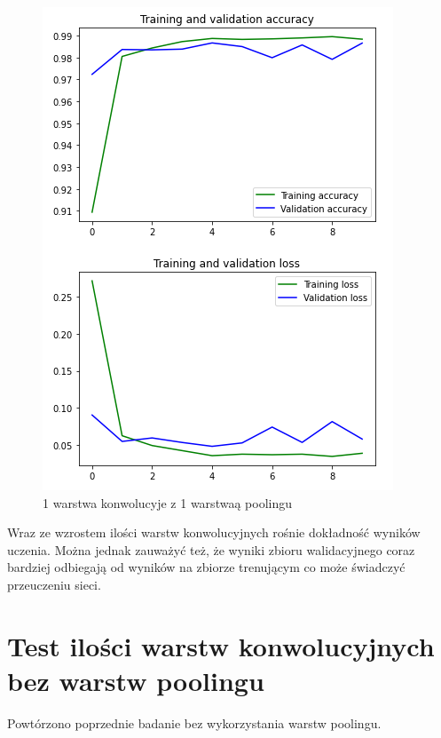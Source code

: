 \documentclass{article}
\begin{document}
\begin{figure}[h]
  \centering
  \includegraphics[width=\linewidth]{3_conv_3_max.png}
  \caption{1 warstwa konwolucyje z 1 warstwaą poolingu}
\end{figure}

Wraz ze wzrostem ilości warstw konwolucyjnych rośnie dokładność wyników uczenia. Można jednak zauważyć też,
że wyniki zbioru walidacyjnego coraz bardziej odbiegają od wyników na zbiorze trenującym co może świadczyć
przeuczeniu sieci.


\section{Test ilości warstw konwolucyjnych bez warstw poolingu}

Powtórzono poprzednie badanie bez wykorzystania warstw poolingu.
\end{document}
